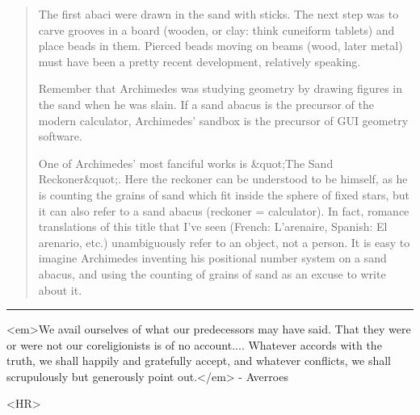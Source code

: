 \begin{quote}
The first abaci were drawn in the sand with sticks. The next
step was to carve grooves in a board (wooden, or clay: think
cuneiform tablets) and place beads in them. Pierced beads
moving on beams (wood, later metal) must have been a pretty
recent development, relatively speaking.

Remember that Archimedes was studying geometry by drawing
figures in the sand when he was slain. If a sand abacus is the
precursor of the modern calculator, Archimedes' sandbox is the
precursor of GUI geometry software. 

One of Archimedes' most fanciful works is &quot;The Sand Reckoner&quot;.
Here the reckoner can be understood to be himself, as he is
counting the grains of sand which fit inside the sphere of
fixed stars, but it can also refer to a sand abacus (reckoner
= calculator). In fact, romance translations of this title
that I've seen (French: L'arenaire, Spanish: El arenario, etc.)
unambiguously refer to an object, not a person. It is easy to
imagine Archimedes inventing his positional number system on a
sand abacus, and using the counting of grains of sand as an
excuse to write about it.

\end{quote}
    


\par\noindent\rule{\textwidth}{0.4pt}
<em>We avail ourselves of what our predecessors may have said.  
That they were or were not our coreligionists is of no account....
Whatever accords with the truth, we shall happily and gratefully
accept, and whatever conflicts, we shall scrupulously but generously
point out.</em> - Averroes 

<HR>



